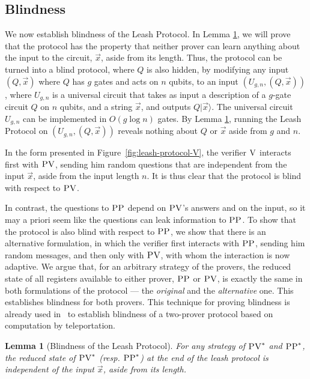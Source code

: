 \documentclass[11pt]{article}
\newtheorem{lemma}[theorem]{Lemma}
\theoremstyle{remark}
\theoremstyle{definition}
\newcommand{\ket}[1]{|#1\rangle}
\newcommand{\ver}{\textsc{V}}
\newcommand{\pv}{\textsc{PV}}
\newcommand{\pp}{\textsc{PP}}
\begin{document}
\subsection{Blindness}
\label{sec:leash-blind}

We now establish blindness of the Leash Protocol. In Lemma \ref{lem:blindness}, we will prove that the protocol has the property that neither prover can learn anything about the input to the circuit, $\vec{x}$, aside from its length. Thus, the protocol can be turned into a blind protocol, where $Q$ is also hidden, by modifying any input $(Q,\vec{x})$ where $Q$ has $g$ gates and acts on $n$ qubits, to an input $(U_{g,n},(Q,\vec{x}))$, where $U_{g,n}$ is a universal circuit that takes as input a description of a $g$-gate circuit $Q$ on $n$ qubits, and a string $\vec{x}$, and outputs $Q\ket{\vec{x}}$. The universal circuit $U_{g,n}$ can be implemented in $O(g\log n)$ gates. By Lemma \ref{lem:blindness}, running the Leash Protocol on $(U_{g,n},(Q,\vec{x}))$ reveals nothing about $Q$ or $\vec{x}$ aside from $g$ and $n$.

In the form presented in Figure~\ref{fig:leash-protocol-V}, the verifier $\ver$ interacts first with $\pv$, sending him random questions that are independent from the input $\vec{x}$, aside from the input length $n$. It is thus clear that the protocol is blind with respect to $\pv$. 

In contrast, the questions to $\pp$ depend on $\pv$'s answers and on the input, so it may a priori seem like the questions can leak information to $\pp$. To show that the protocol is also blind with respect to $\pp$, we show that there is an alternative formulation, in which the verifier first interacts with $\pp$, sending him random messages, and then only with $\pv$, with whom the interaction is now adaptive. We argue that, for an arbitrary strategy of the provers, the reduced state of all registers available to either prover, $\pp$ or $\pv$, is exactly the same in both formulations of the protocol --- the \emph{original} and the \emph{alternative} one. This establishes blindness for both provers. This technique for proving blindness is already used in~\cite{reichardt2012classical} to establish blindness of a two-prover protocol based on computation by teleportation. 


\begin{lemma}[Blindness of the Leash Protocol]\label{lem:blindness}
For any strategy of $\pv^*$ and $\pp^*$, the reduced state of $\pv^*$ (resp. $\pp^*$) at the end of the leash protocol
is independent of the input $\vec{x}$, aside from its length.
\end{lemma}
\end{document}
